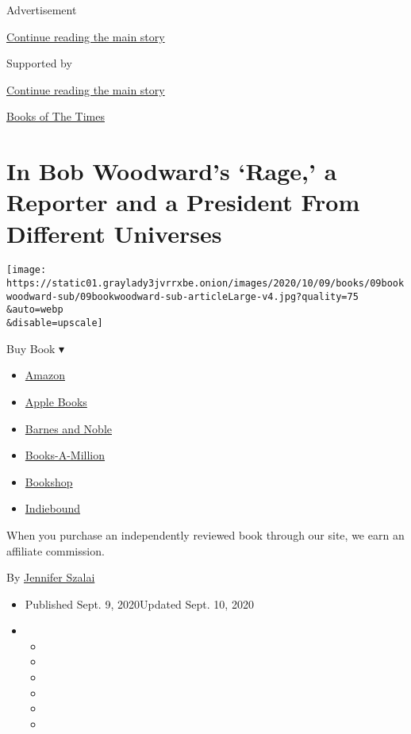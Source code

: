 Advertisement

\protect\hyperlink{after-top}{Continue reading the main story}

Supported by

\protect\hyperlink{after-sponsor}{Continue reading the main story}

\href{/column/books-of-the-times}{Books of The Times}

\hypertarget{in-bob-woodwards-rage-a-reporter-and-a-president-from-different-universes}{%
\section{In Bob Woodward's `Rage,' a Reporter and a President From
Different
Universes}\label{in-bob-woodwards-rage-a-reporter-and-a-president-from-different-universes}}

\texttt{[image: https://static01.graylady3jvrrxbe.onion/images/2020/10/09/books/09bookwoodward-sub/09bookwoodward-sub-articleLarge-v4.jpg?quality=75\\\&auto=webp\\\&disable=upscale]}

Buy Book ▾

\begin{itemize}
\tightlist
\item
  \href{https://www.amazon.com/gp/search?index=books\&tag=NYTBSREV-20\&field-keywords=Rage+Bob+Woodward}{Amazon}
\item
  \href{https://du-gae-books-dot-nyt-du-prd.appspot.com/buy?title=Rage\&author=Bob+Woodward}{Apple
  Books}
\item
  \href{https://www.anrdoezrs.net/click-7990613-11819508?url=https\%3A\%2F\%2Fwww.barnesandnoble.com\%2Fw\%2F\%3Fean\%3D9781982131739}{Barnes
  and Noble}
\item
  \href{https://www.anrdoezrs.net/click-7990613-35140?url=https\%3A\%2F\%2Fwww.booksamillion.com\%2Fp\%2FRage\%2FBob\%2BWoodward\%2F9781982131739}{Books-A-Million}
\item
  \href{https://bookshop.org/a/3546/9781982131739}{Bookshop}
\item
  \href{https://www.indiebound.org/book/9781982131739?aff=NYT}{Indiebound}
\end{itemize}

When you purchase an independently reviewed book through our site, we
earn an affiliate commission.

By \href{https://www.nytimes3xbfgragh.onion/by/jennifer-szalai}{Jennifer
Szalai}

\begin{itemize}
\item
  Published Sept. 9, 2020Updated Sept. 10, 2020
\item
  \begin{itemize}
  \item
  \item
  \item
  \item
  \item
  \item
  \end{itemize}
\end{itemize}

